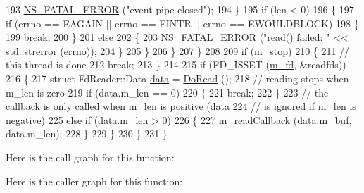 \begin{DoxyCode}
193                   \hyperlink{group__fatal_ga5131d5e3f75d7d4cbfd706ac456fdc85}{NS\_FATAL\_ERROR} (\textcolor{stringliteral}{"event pipe closed"});
194                 \}
195               \textcolor{keywordflow}{if} (len < 0)
196                 \{
197                   \textcolor{keywordflow}{if} (errno == EAGAIN || errno == EINTR || errno == EWOULDBLOCK)
198                     \{
199                       \textcolor{keywordflow}{break};
200                     \}
201                   \textcolor{keywordflow}{else}
202                     \{
203                       \hyperlink{group__fatal_ga5131d5e3f75d7d4cbfd706ac456fdc85}{NS\_FATAL\_ERROR} (\textcolor{stringliteral}{"read() failed: "} << std::strerror (errno));
204                     \}
205                 \}
206             \}
207         \}
208 
209       \textcolor{keywordflow}{if} (\hyperlink{classns3_1_1FdReader_a53bb467852fcfe1a12dd0e32f846b01e}{m\_stop})
210         \{
211           \textcolor{comment}{// this thread is done}
212           \textcolor{keywordflow}{break};
213         \}
214 
215       \textcolor{keywordflow}{if} (FD\_ISSET (\hyperlink{classns3_1_1FdReader_ad0883be1c0ebac30885c17c0cc17076d}{m\_fd}, &readfds))
216         \{
217           \textcolor{keyword}{struct }FdReader::Data \hyperlink{topology-example-sim_8cc_a26c65296e316af77b787dc77469bb2a4}{data} = \hyperlink{classns3_1_1FdReader_a5d622d726859828ba7bc557b57689b1b}{DoRead} ();
218           \textcolor{comment}{// reading stops when m\_len is zero}
219           \textcolor{keywordflow}{if} (data.m\_len == 0)
220             \{
221               \textcolor{keywordflow}{break};
222             \}
223           \textcolor{comment}{// the callback is only called when m\_len is positive (data}
224           \textcolor{comment}{// is ignored if m\_len is negative)}
225           \textcolor{keywordflow}{else} \textcolor{keywordflow}{if} (data.m\_len > 0)
226             \{
227               \hyperlink{classns3_1_1FdReader_af5cd7136ecc802487df40cd8046d6fe1}{m\_readCallback} (data.m\_buf, data.m\_len);
228             \}
229         \}
230     \}
231 \}
\end{DoxyCode}


Here is the call graph for this function\+:




Here is the caller graph for this function\+:


